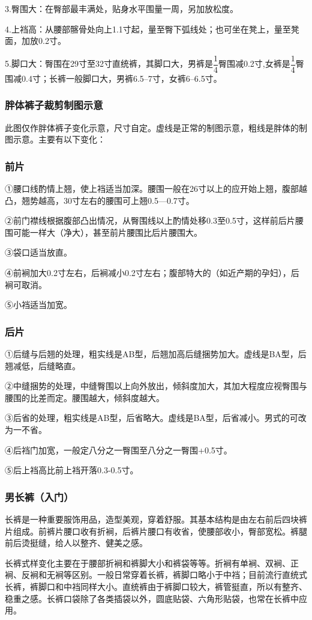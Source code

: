 \documentclass{ctexbook}
\begin{document}
3.臀围大：在臀部最丰满处，贴身水平围量一周，另加放松度。

4.上裆高：从腰部髂骨处向上1.1寸起，量至臀下弧线处；也可坐在凳上，量至凳面，加放0.2寸。

5.脚口大：臀围在29寸至32寸直统裤，其脚口大，男裤是$\dfrac{1}{4}$臀围减0.2寸,女裤是$\dfrac{1}{4}$臀围减0.4寸；长裤一般脚口大，男裤6.5--7寸，女裤6--6.5寸。
\subsubsection{胖体裤子裁剪制图示意}
此图仅作胖体裤子变化示意，尺寸自定。虚线是正常的制图示意，粗线是胖体的制图示意。主要有以下变化：
\subsubsection{前片}
①腰口线酌情上翘，使上裆适当加深。腰围一般在26寸以上的应开始上翘，腹部越凸，翘势越高，30寸左右的腰围可上翘0.5—0.7寸。

②前门襟线根据腹部凸出情况，从臀围线以上酌情处移0.3至0.5寸，这样前后片腰围可能一样大（净大），甚至前片腰围比后片腰围大。

③袋口适当放直。

④前裥加大0.2寸左右，后裥减小0.2寸左右；腹部特大的（如近产期的孕妇），后裥可取消。

⑤小裆适当加宽。
\subsubsection{后片}
①后缝与后翘的处理，粗实线是AB型，后翘加高后缝捆势加大。虚线是BA型，后翘减低，后缝略直。

②中缝捆势的处理，中缝臀围以上向外放出，倾斜度加大，其加大程度应视臀围与腰围的比差而定。腰围越大，倾斜度越大。

③后省的处理，粗实线是AB型，后省略大。虚线是BA型，后省减小。男式的可改为一不省。

④后裆门加宽，一般定八分之一臀围至八分之一臀围+0.5寸。

⑤后上裆高比前上裆开落0.3-0.5寸。
\subsubsection{男长裤（入门）}
长裤是一种重要服饰用品，造型美观，穿着舒服。其基本结构是由左右前后四块裤片组成。前裤片腰口收有折裥，后裤片腰口有收省，使腰部收小，臀部宽松。裤腿前后烫挺缝，给人以整齐、健美之感。

长裤式样变化主要在于腰部折裥和裤脚大小和裤袋等等。折裥有单裥、双裥、正裥、反裥和无裥等区别。一般日常穿着长裤，裤脚口略小于中裆；目前流行直统式长裤，裤脚口和中裆同样大小。直统裤由于裤脚口较大，裤管挺直，所以有整齐、稳重之感。长裤口袋除了各类插袋以外，圆底贴袋、六角形贴袋，也常在长裤中应用。
\end{document}
